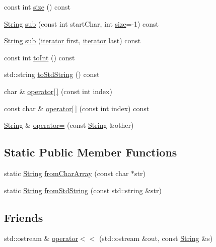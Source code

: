 \begin{DoxyCompactItemize}
\item 
const int \hyperlink{classprism_1_1_string_a603b5a90681d43adf7c6c29018e0300c}{size} () const 
\item 
\hyperlink{classprism_1_1_string}{String} \hyperlink{classprism_1_1_string_a4249170c6ee2d8d409e7b2c1c66092e4}{sub} (const int start\+Char, int \hyperlink{classprism_1_1_string_a603b5a90681d43adf7c6c29018e0300c}{size}=-\/1) const 
\item 
\hyperlink{classprism_1_1_string}{String} \hyperlink{classprism_1_1_string_aea30772127a513ced41ebd44fe3d48f0}{sub} (\hyperlink{classprism_1_1_string_adacc7975837e5fff95d70690777fb330}{iterator} first, \hyperlink{classprism_1_1_string_adacc7975837e5fff95d70690777fb330}{iterator} last) const 
\item 
const int \hyperlink{classprism_1_1_string_afbf22d03096777ef6909794edc18a0f9}{to\+Int} () const 
\item 
std\+::string \hyperlink{classprism_1_1_string_ad1018741610a6723a38ab52255147ac4}{to\+Std\+String} () const 
\item 
char \& \hyperlink{classprism_1_1_string_a2aa545085262fc28c9199a5790bfbd0a}{operator\mbox{[}$\,$\mbox{]}} (const int index)
\item 
const char \& \hyperlink{classprism_1_1_string_ad519fe1a0696fe5c4b77808d605bc68e}{operator\mbox{[}$\,$\mbox{]}} (const int index) const 
\item 
\hyperlink{classprism_1_1_string}{String} \& \hyperlink{classprism_1_1_string_ad2c84ac36bccdb26c446d32a1615f321}{operator=} (const \hyperlink{classprism_1_1_string}{String} \&other)
\end{DoxyCompactItemize}
\subsection*{Static Public Member Functions}
\begin{DoxyCompactItemize}
\item 
static \hyperlink{classprism_1_1_string}{String} \hyperlink{classprism_1_1_string_a11d319bfb0bf70ffdf71d2fc65b963db}{from\+Char\+Array} (const char $\ast$str)
\item 
static \hyperlink{classprism_1_1_string}{String} \hyperlink{classprism_1_1_string_a8692b9a7e4c25f349bb83b53ff3d6f36}{from\+Std\+String} (const std\+::string \&str)
\end{DoxyCompactItemize}
\subsection*{Friends}
\begin{DoxyCompactItemize}
\item 
std\+::ostream \& \hyperlink{classprism_1_1_string_a22f0a77d546199afaac3503fc9b9ef51}{operator$<$$<$} (std\+::ostream \&out, const \hyperlink{classprism_1_1_string}{String} \&s)
\end{DoxyCompactItemize}



